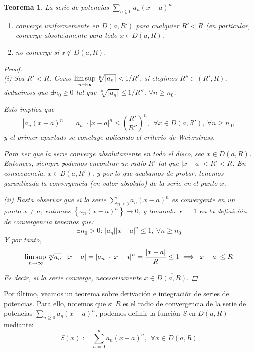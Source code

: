 \documentclass[11pt, a4paper]{article}
\let\epsilon\upvarepsilon
\theoremstyle{theorem-style}
\newtheorem{nth}{Teorema}[section]
\theoremstyle{definition-style}
\theoremstyle{remark-style}
\theoremstyle{example-style}
\newenvironment{nlist}
{\begin{enumerate}
\renewcommand\labelenumi{(\emph{\roman{enumi})}}}
{\end{enumerate}}
\begin{document}
\begin{nth} \label{13}
La serie de potencias $\displaystyle\sum_{n\geq 0} a_n (x-a)^n$  
\begin{nlist}
\item converge uniformemente en $D(a,R')$ para cualquier $R'<R$ (en particular, converge absolutamente para todo $x\in D(a,R)$.
\item no converge si $x\not\in \overline{D(a,R)}$.
\end{nlist}

\begin{proof} \hfill \\
	\textit{(i)} Sea $R'<R$. Como $\underset{n\to\infty}{\mbox{lim\,sup\,}} \sqrt[n]{|a_n|} < 1/R'$, si elegimos $R''\in (R',R)$, deducimos que $\exists n_0\geq 0$ tal que $\sqrt[n]{|a_n|} \leq 1/R''$, $\forall n\geq n_0$.

Esto implica que
\[
\left| a_n (x-a)^n\right| = |a_n|\cdot|x-a|^n \leq \left(\frac{R'}{R''}\right)^n, \ \ \forall x\in D(a,R'), \ \forall n\geq n_0,
\]
y el primer apartado se concluye aplicando el criterio de Weierstrass.

Para ver que la serie converge absolutamente en todo el disco, sea $x \in D(a,R)$. Entonces, siempre podemos encontrar un radio $R'$ tal que $|x-a| < R' < R$. En consecuencia, $x \in D(a,R')$, y por lo que acabamos de probar, tenemos garantizada la convergencia (en valor absoluto) de la serie en el punto $x$. 

\textit{(ii)} Basta observar que si la serie $\sum_{n\geq 0} a_n (x-a)^n$ es convergente en un punto $x\not= a$, entonces $\left\{ a_n (x-a)^n \right\} \to 0$, y tomando $\epsilon = 1$ en la definición de convergencia tenemos que:
\[
\exists n_0>0: \,  |a_n| |x-a|^n \leq 1, \ \forall n\geq n_0
\]
Y por tanto, $$\underset{n\to\infty}{\mbox{lim\,sup\,}} \sqrt[n]{a_n} \cdot |x-a| = |a_n| \cdot |x-a|^n =\frac{|x-a|}{R} \leq 1 \implies |x-a| \le R$$

Es decir, si la serie converge, necesariamente $x \in \overline{D(a,R)}.$
\end{proof}
\end{nth}

Por último, veamos un teorema sobre derivación e integración de series de potencias. Para ello, notemos que si $R$ es el radio de convergencia de la serie de potencias $\displaystyle\sum_{n\geq 0} a_n (x-a)^n$, podemos definir la función $S$ en $D(a,R)$ mediante: \[ 
S(x):= \sum_{n= 0}^\infty a_n (x-a)^n
, \ \ \forall x\in  D(a,R)
\] 
\end{document}
